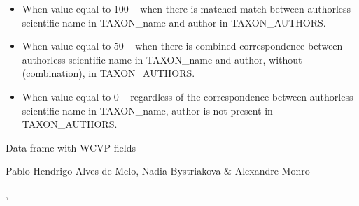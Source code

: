 \documentclass[a4paper]{book}
\begin{document}
\begin{Details}
\begin{itemize}
\begin{itemize}
\item{} When value equal to 100 – when there is matched match between authorless scientific name in TAXON\_name and author in TAXON\_AUTHORS.
\item{} When value equal to 50 – when there is combined correspondence between authorless scientific name in TAXON\_name and author, without (combination), in TAXON\_AUTHORS.
\item{} When value equal to 0 – regardless of the correspondence between authorless scientific name in TAXON\_name, author is not present in TAXON\_AUTHORS.

\end{itemize}


\end{itemize}

\end{Details}
%
\begin{Value}
Data frame with WCVP fields
\end{Value}
%
\begin{Author}
Pablo Hendrigo Alves de Melo,
Nadia Bystriakova \&
Alexandre Monro
\end{Author}
%
\begin{SeeAlso}
, 
\end{SeeAlso}
%
\end{document}
